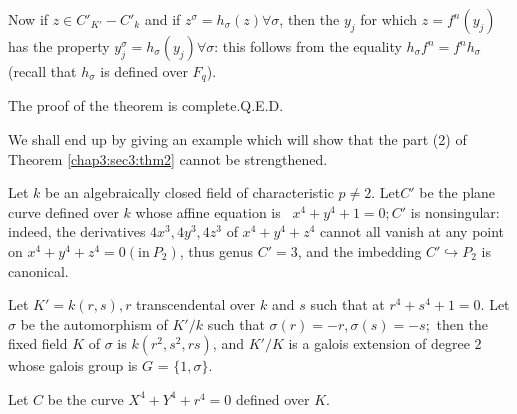 Now if $z \in C'_{K'} - C'_{k}$ and if $z^{\sigma} = h_{\sigma}(z)
\forall \sigma$, then the $y_j$ for which $z = f^{n}(y_j)$ has the
property $y_{j}^{\sigma} = h_{\sigma}(y_j)\forall\sigma$: this follows
from the equality ${h_{\sigma}f^{n} = f^{n}h_{\sigma}}$ (recall that
$h_{\sigma}$ is defined over $F_{q}$). 

\noindent
 The proof of the theorem is complete.\hfill{Q.E.D.}

We shall end up by giving an example which will show that the part
(2) of Theorem \ref{chap3:sec3:thm2} cannot be strengthened. 

\begin{example*}%
  Let $k$ be an algebraically closed field of characteristic $p \neq 2$.
  Let\pageoriginale $C'$ be the plane curve defined over $k$ whose affine equation
  is ~$x^{4}+y^{4} + 1 = 0 ; C'$ is nonsingular: indeed, the
  derivatives $4x^3 , 4y^3, 4z^3$ of $x^4 + y^4 + z^4$ cannot all
  vanish at any point on $x^4 + y^4 + z^4 = 0 (\text{in}~ {P}_2)$, thus genus
  $C' = 3$, and the imbedding $C'\hookrightarrow{P}_2$ is canonical. 
\end{example*}

Let $K' = k(r,s), r$ transcendental over $k$ and $s$ such that at $r^4
+ s^4 + 1 = 0$. Let $\sigma$ be the automorphism of $K'/k$ such that
$\sigma{(r)= -r, \sigma(s) = -s;}$ then the fixed field $K$ of
$\sigma$ is $k(r^2, s^2, rs)$, and  $K'/K$ is a galois extension of
degree $2$ whose galois group is $G$ = $\{1,\sigma\} $. 

Let $C$ be the curve $X^4 + Y^4 + r^4 = 0$ defined over $K$. 

